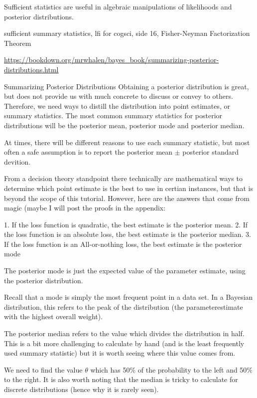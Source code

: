 Sufficient statistics are useful in algebraic manipulations of likelihoods and posterior distributions.

sufficient summary statistics, lfi for cogsci, side 16, Fisher-Neyman Factorization Theorem

\url{https://bookdown.org/mrwhalen/bayes_book/summarizing-posterior-distributions.html}

Summarizing Posterior Distributions
Obtaining a posterior distribution is great, but does not provide us with much concrete to discuss or convey to others. Therefore, we need ways to distill the distribution into point estimates, or summary statistics. The most common summary statistics for posterior distributions will be the posterior mean, posterior mode and posterior median.

At times, there will be different reasons to use each summary statistic, but most often a safe assumption is to report the posterior mean $\pm$ posterior standard devition.

From a decision theory standpoint there technically are mathematical ways to determine which point estimate is the best to use in certian instances, but that is beyond the scope of this tutorial. However, here are the answers that come from magic (maybe I will post the proofs in the appendix:

1. If the loss function is quadratic, the best estimate is the posterior mean.
2. If the loss function is an absolute loss, the best estimate is the posterior median.
3. If the loss function is an All-or-nothing loss, the best estimate is the posterior mode

The posterior mode is just the expected value of the parameter estimate, using the posterior distribution.

Recall that a mode is simply the most frequent point in a data set. In a Bayesian distribution, this refers to the peak of the distribution (the parameterestimate with the highest overall weight). 

The posterior median refers to the value which divides the distribution in half. This is a bit more challenging to calculate by hand (and is the least frequently used summary statistic) but it is worth seeing where this value comes from.

We need to find the value $\theta$ which has 50\% of the probability to the left and 50\% to the right. It is also worth noting that the median is tricky to calculate for discrete distributions (hence why it is rarely seen).


